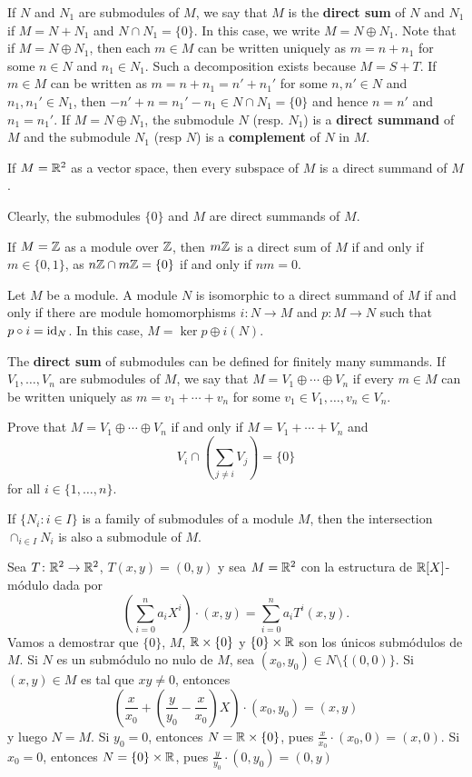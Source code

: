 If $N$ and $N_1$ are submodules of $M$, we say that $M$ is the \textbf{direct sum} of $N$ and $N_1$
if $M=N+N_1$ and $N\cap N_1=\{0\}$. In this case, we write $M=N\oplus N_1$. Note that if
$M=N\oplus N_1$, then each $m\in M$ can be written uniquely as $m=n+n_1$ for some
 $n\in N$ and $n_1\in N_1$. 
Such a decomposition exists because $M=S+T$. If $m\in M$ can be written as 
$m=n+n_1=n'+n_1'$ for some $n,n'\in N$ and $n_1,n_1'\in N_1$, then 
$-n'+n=n_1'-n_1\in N\cap N_1=\{0\}$ and hence $n=n'$ and $n_1=n_1'$. If $M=N\oplus N_1$, the submodule
$N$ (resp. $N_1$) is a \textbf{direct summand} of $M$ and the submodule $N_1$ (resp $N$) is a \textbf{complement} of $N$ 
in $M$.   	

\begin{example}
If $M=\mathbb{R}^2$ as a vector space, then every subspace of $M$ is a direct summand of $M$.
\end{example}

Clearly, the submodules $\{0\}$ and $M$ are direct summands of $M$.

\begin{example}
If $M=\mathbb{Z}$ as a module over $\mathbb{Z}$, then $m\mathbb{Z}$ is a direct sum of $M$ if and only if 
$m\in\{0,1\}$, as $n\mathbb{Z}\cap m\mathbb{Z}=\{0\}$ if and only if $nm=0$.
\end{example}

\begin{exercise}
\label{xca:projector}
Let $M$ be a module. 
A module $N$ is isomorphic to a direct summand of $M$ if and only if
there are module homomorphisms $i\colon N\to M$ and $p\colon M\to N$ 
such that $p\circ i=\operatorname{id}_N$. In this case, $M=\ker p\oplus i(N)$.  
\end{exercise}

The \textbf{direct sum} of submodules can be defined for finitely many summands. 
If $V_1,\dots,V_n$ are submodules of $M$, we say that $M=V_1\oplus\cdots\oplus V_n$ 
if every $m\in M$ can be written uniquely as $m=v_1+\cdots+v_n$ for some $v_1\in V_1,\dots,v_n\in V_n$. 

\begin{exercise}
Prove that $M=V_1\oplus\cdots\oplus V_n$ if and only if 
$M=V_1+\cdots+V_n$ and 
\[
V_i\cap\left(\sum_{j\ne i}V_j\right)=\{0\}
\]	
for all $i\in\{1,\dots,n\}$.
\end{exercise}

If $\{N_i:i\in I\}$ is a family of submodules of a module $M$, then the intersection 
$\cap_{i\in I}N_i$ is also a submodule of $M$.

\begin{example}
Sea $T\colon\mathbb{R}^2\to\mathbb{R}^2$, $T(x,y)=(0,y)$ y sea $M=\mathbb{R}^2$ con la estructura de $\mathbb{R}[X]$-módulo dada por
\[
\left(\sum_{i=0}^n a_iX^i\right)\cdot (x,y)=\sum_{i=0}^n a_iT^i(x,y).
\]
Vamos a demostrar que
$\{0\}$, $M$, $\mathbb{R}\times\{0\}$ y $\{0\}\times\mathbb{R}$ son los únicos submódulos de $M$. Si $N$ es un submódulo no nulo de $M$, sea
$(x_0,y_0)\in N\setminus\{(0,0)\}$. Si $(x,y)\in M$ es tal que $xy\ne 0$, entonces
\[
\left(\frac{x}{x_0}+\left(\frac{y}{y_0}-\frac{x}{x_0}\right)X\right)\cdot (x_0,y_0)=(x,y) 
\]
y luego $N=M$. Si $y_0=0$, entonces $N=\mathbb{R}\times\{0\}$, pues $\frac{x}{x_0}\cdot (x_0,0)=(x,0)$. Si $x_0=0$, entonces
$N=\{0\}\times\mathbb{R}$, pues 
$\frac{y}{y_0}\cdot (0,y_0)=(0,y)$ 
\end{example}


